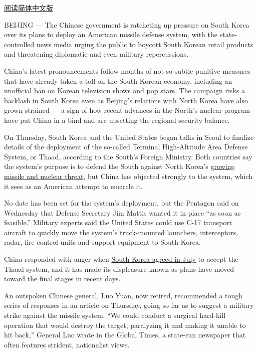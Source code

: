 \href{http://cn.nytimes.com/asia-pacific/20170303/china-north-south-korea/}{阅读简体中文版}

BEIJING --- The Chinese government is ratcheting up pressure on South
Korea over its plans to deploy an American missile defense system, with
the state-controlled news media urging the public to boycott South
Korean retail products and threatening diplomatic and even military
repercussions.

China's latest pronouncements follow months of not-so-subtle punitive
measures that have already taken a toll on the South Korean economy,
including an unofficial ban on Korean television shows and pop stars.
The campaign risks a backlash in South Korea even as Beijing's relations
with North Korea have also grown strained --- a sign of how recent
advances in the North's nuclear program have put China in a bind and are
upsetting the regional security balance.

On Thursday, South Korea and the United States began talks in Seoul to
finalize details of the deployment of the so-called Terminal
High-Altitude Area Defense System, or Thaad, according to the South's
Foreign Ministry. Both countries say the system's purpose is to defend
the South against North Korea's
\href{https://www.nytimes.com/2017/02/13/world/asia/north-korea-missile-launch-success.html}{growing
missile and nuclear threat}, but China has objected strongly to the
system, which it sees as an American attempt to encircle it.

No date has been set for the system's deployment, but the Pentagon said
on Wednesday that Defense Secretary Jim Mattis wanted it in place ``as
soon as feasible.'' Military experts said the United States could use
C-17 transport aircraft to quickly move the system's truck-mounted
launchers, interceptors, radar, fire control units and support equipment
to South Korea.

China responded with anger when
\href{https://www.nytimes.com/2016/07/08/world/asia/south-korea-and-us-agree-to-deploy-missile-defense-system.html}{South
Korea agreed in July} to accept the Thaad system, and it has made its
displeasure known as plans have moved toward the final stages in recent
days.

An outspoken Chinese general, Luo Yuan, now retired, recommended a tough
series of responses in an article on Thursday, going so far as to
suggest a military strike against the missile system. ``We could conduct
a surgical hard-kill operation that would destroy the target, paralyzing
it and making it unable to hit back,'' General Luo wrote in the Global
Times, a state-run newspaper that often features strident, nationalist
views.

